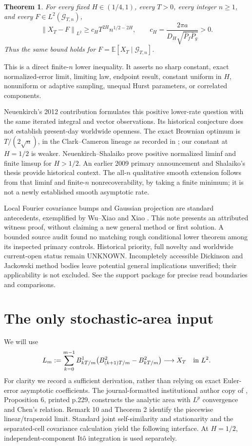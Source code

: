 \documentclass[11pt]{article}
\newtheorem{theorem}{Theorem}
\newcommand{\E}{\mathbb E}
\newcommand{\G}{\mathcal G}
\newcommand{\norm}[1]{\left\lVert#1\right\rVert}
\begin{document}
\begin{theorem}\label{thm:main}
For every fixed $H\in(1/4,1)$, every $T>0$, every integer $n\ge1$, and every $F\in L^2(\G_{T,n})$,
\begin{equation}
\norm{X_T-F}_{L^2}\ge c_HT^{2H}n^{1/2-2H},\qquad
c_H=\frac{2\pi a}{D_H\sqrt{\overline P_f\overline P_g}}>0.
\label{eq:target}
\end{equation}
Thus the same bound holds for $F=\E[X_T\mid\G_{T,n}]$.
\end{theorem}
This is a direct finite-$n$ lower inequality. It asserts no sharp constant, exact normalized-error limit, limiting law, endpoint result, constant uniform in $H$, nonuniform or adaptive sampling, unequal Hurst parameters, or correlated components.

Neuenkirch's 2012 contribution \cite{owr} formulates this positive lower-rate question with the same iterated integral and vector observations. Its historical conjecture does not establish present-day worldwide openness. The exact Brownian optimum is $T/(2\sqrt n)$, in the Clark--Cameron lineage as recorded in \cite{owr,ns}; our constant at $H=1/2$ is weaker. Neuenkirch--Shalaiko \cite{ns} prove positive normalized liminf and finite limsup for $H>1/2$. An earlier 2009 primary announcement \cite{dagstuhl} and Shalaiko's thesis \cite{thesis} provide historical context. The all-$n$ qualitative smooth extension follows from that liminf and finite-$n$ nonrecoverability, by taking a finite minimum; it is not a newly established smooth asymptotic rate.

Local Fourier covariance bumps and Gaussian projection are standard antecedents, exemplified by Wu--Xiao \cite{wuxiao} and Xiao \cite{xiao}. This note presents an attributed witness proof, without claiming a new general method or first solution. A bounded source audit found no matching rough conditional lower theorem among its inspected primary controls. Historical priority, full novelty and worldwide current-open status remain UNKNOWN. Incompletely accessible Dickinson and Jackowski method bodies \cite{dickinson,jackowski} leave potential general implications unverified; their applicability is not excluded. See the support package for precise read boundaries and comparisons.

\section{The only stochastic-area input}
We will use
\begin{equation}
L_m:=\sum_{k=0}^{m-1}B^1_{kT/m}
\bigl(B^2_{(k+1)T/m}-B^2_{kT/m}\bigr)\longrightarrow X_T
\quad\hbox{in }L^2.\label{eq:euler}
\end{equation}
For clarity we record a sufficient derivation, rather than relying on exact Euler-error asymptotic coefficients. The journal-formatted institutional author copy of \cite{ntu}, Proposition 6, printed p.229, constructs the analytic area with $L^p$ convergence and Chen's relation. Remark 10 and Theorem 2 identify the piecewise linear/trapezoid limit. Standard joint self-similarity and stationarity and the separated-cell covariance calculation yield the following interface. At $H=1/2$, independent-component It\^o integration is used separately.
\end{document}
